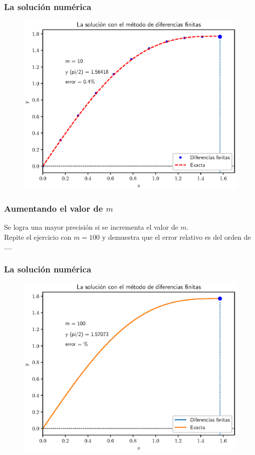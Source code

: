 \documentclass[12pt]{beamer}
\begin{document}
\begin{frame}
\frametitle{La solución numérica}
\begin{figure}
    \centering
    \includegraphics[scale=0.55]{Imagenes/plot_CDF_Dif_Fin_Ejercicio_01_01.eps}
\end{figure}
\end{frame}
\begin{frame}
\frametitle{Aumentando el valor de $m$}
Se logra una mayor precisión si se incrementa el valor de $m$.
\\
\bigskip
\pause
Repite el ejercicio con $m = 100$ y demuestra que el error relativo es del orden de ....
\end{frame}
\begin{frame}
\frametitle{La solución numérica}
\begin{figure}
    \centering
    \includegraphics[scale=0.55]{Imagenes/plot_CDF_Dif_Fin_Ejercicio_01_02.eps}
\end{figure}
\end{frame}
\end{document}
